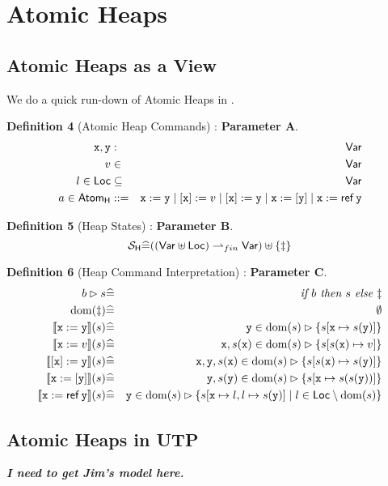 \section{Atomic Heaps}

\subsection{Atomic Heaps as a View}

We do a quick run-down of Atomic Heaps in \cite{conf/popl/Dinsdale-YoungBGPY13}.

\textbf{Definition 4 }(Atomic Heap Commands) : \textbf{Parameter A}.
\begin{eqnarray*}
   \mathtt{x},\mathtt{y} &:& \mathsf{Var}
\\ v &\in& \mathsf{Var}
\\ l \in \mathsf{Loc} &\subseteq& \mathsf{Var}
\\ a \in \mathsf{Atom_{H}}
   &::=&
   \mathtt{x} := \mathtt{y}
   \mid
   [\mathtt{x}] := v
   \mid
   [\mathtt{x}] := \mathtt{y}
   \mid
   \mathtt{x} := [\mathtt{y}]
   \mid
   \mathtt{x} := \mathop{\mathsf{ref}}\mathtt{y}
\end{eqnarray*}

\textbf{Definition 5} (Heap States) : \textbf{Parameter B}.
\[
 \mathcal{S}_{\mathsf{H}} \widehat= ((\mathsf{Var} \uplus \mathsf{Loc}) \rightharpoonup_{fin} \mathsf{Var}) \uplus \{\ddagger\}
\]

\textbf{Definition 6} (Heap Command Interpretation) : \textbf{Parameter C}.
\begin{eqnarray*}
   b \rhd s &\defs& \textit{if }b\textit{ then }s\textit{ else }\bang
\\ \dom(\bang) &\defs& \emptyset
\\ \sem{\vx:=\vy}(s)
              &\defs& \vy \in \dom(s)\rhd \setof{s[\vx \mapsto s(\vy)]}
\\ \sem{\vx:=v}(s)
              &\defs& \vx,s(\vx) \in \dom(s)\rhd \setof{s[s(\vx) \mapsto v]}
\\ \sem{[\vx]:=\vy}(s)
              &\defs& \vx,\vy,s(\vx) \in \dom(s)\rhd \setof{s[s(\vx) \mapsto s(\vy)]}
\\ \sem{\vx:=[\vy]}(s)
              &\defs& \vy,s(\vy) \in \dom(s)\rhd \setof{s[\vx \mapsto s(s(\vy))]}
\\ \sem{\vx:=\reft\vy}(s)
              &\defs& \vy \in \dom(s)\rhd
              \setof{s[\vx \mapsto l,l \mapsto s(\vy)] \mid l \in \Loc \setminus \dom(s) }
\end{eqnarray*}


\subsection{Atomic Heaps in UTP}

\textbf{\emph{I need to get Jim's model here.}}
